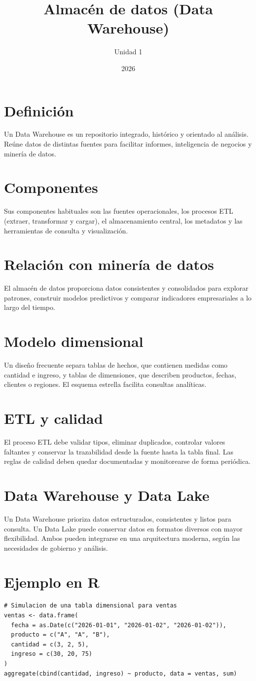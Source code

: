 \documentclass[12pt,a4paper]{article}
\title{Almacén de datos (Data Warehouse)}
\author{Unidad 1}
\date{2026}
\begin{document}
\maketitle
\section{Definición}
Un Data Warehouse es un repositorio integrado, histórico y orientado al análisis. Reúne datos de distintas fuentes para facilitar informes, inteligencia de negocios y minería de datos.
\section{Componentes}
Sus componentes habituales son las fuentes operacionales, los procesos ETL (extraer, transformar y cargar), el almacenamiento central, los metadatos y las herramientas de consulta y visualización.
\section{Relación con minería de datos}
El almacén de datos proporciona datos consistentes y consolidados para explorar patrones, construir modelos predictivos y comparar indicadores empresariales a lo largo del tiempo.
\section{Modelo dimensional}
Un diseño frecuente separa tablas de hechos, que contienen medidas como cantidad e ingreso, y tablas de dimensiones, que describen productos, fechas, clientes o regiones. El esquema estrella facilita consultas analíticas.
\section{ETL y calidad}
El proceso ETL debe validar tipos, eliminar duplicados, controlar valores faltantes y conservar la trazabilidad desde la fuente hasta la tabla final. Las reglas de calidad deben quedar documentadas y monitorearse de forma periódica.
\section{Data Warehouse y Data Lake}
Un Data Warehouse prioriza datos estructurados, consistentes y listos para consulta. Un Data Lake puede conservar datos en formatos diversos con mayor flexibilidad. Ambos pueden integrarse en una arquitectura moderna, según las necesidades de gobierno y análisis.
\section{Ejemplo en R}
\begin{lstlisting}
# Simulacion de una tabla dimensional para ventas
ventas <- data.frame(
  fecha = as.Date(c("2026-01-01", "2026-01-02", "2026-01-02")),
  producto = c("A", "A", "B"),
  cantidad = c(3, 2, 5),
  ingreso = c(30, 20, 75)
)
aggregate(cbind(cantidad, ingreso) ~ producto, data = ventas, sum)
\end{lstlisting}
\end{document}
